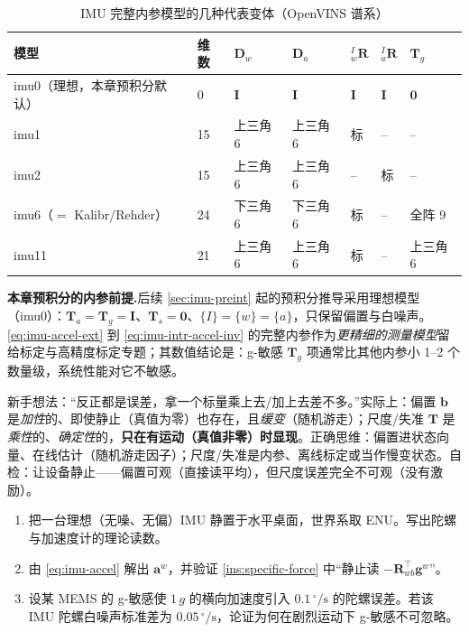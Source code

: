 \begin{table}[H]\centering\small
\caption{IMU 完整内参模型的几种代表变体（OpenVINS 谱系\cite{yang2022online}）}
\label{tab:imu-intrinsics}
\begin{tabular}{lllllll}
\toprule
模型 & 维数 & $\mathbf D_w$ & $\mathbf D_a$ & ${}^I_w\mathbf R$ & ${}^I_a\mathbf R$ & $\mathbf T_g$ \\
\midrule
imu0（理想，本章预积分默认）& 0 & $\mathbf I$ & $\mathbf I$ & $\mathbf I$ & $\mathbf I$ & $\mathbf 0$ \\
imu1 & 15 & 上三角 6 & 上三角 6 & 标 & -- & -- \\
imu2 & 15 & 上三角 6 & 上三角 6 & -- & 标 & -- \\
imu6（$=$ Kalibr/Rehder）& 24 & 下三角 6 & 下三角 6 & 标 & -- & 全阵 9 \\
imu11 & 21 & 上三角 6 & 上三角 6 & 标 & -- & 上三角 6 \\
\bottomrule
\end{tabular}
\end{table}

\begin{note}
\textbf{本章预积分的内参前提.}\;后续 \cref{sec:imu-preint} 起的预积分推导采用理想模型（imu0）：$\mathbf T_a=\mathbf T_g=\mathbf I$、$\mathbf T_s=\mathbf 0$、$\{I\}=\{w\}=\{a\}$，只保留偏置与白噪声。\cref{eq:imu-accel-ext} 到 \cref{eq:imu-intr-accel-inv} 的完整内参作为\emph{更精细的测量模型}留给标定与高精度标定专题；其数值结论是：g-敏感 $\mathbf T_g$ 项通常比其他内参小 1--2 个数量级，系统性能对它不敏感\cite{yang2022online}。
\end{note}

\begin{pitfall}
新手想法：“反正都是误差，拿一个标量乘上去/加上去差不多。”实际上：偏置 $\mathbf b$ 是\emph{加性}的、即使静止（真值为零）也存在，且\emph{缓变}（随机游走）；尺度/失准 $\mathbf T$ 是\emph{乘性}的、\emph{确定性}的，\textbf{只在有运动（真值非零）时显现}。正确思维：偏置进状态向量、在线估计（随机游走因子）；尺度/失准是内参、离线标定或当作慢变状态。自检：让设备静止——偏置可观（直接读平均），但尺度误差完全不可观（没有激励）。
\end{pitfall}

\begin{practice}
\begin{enumerate}
  \item 把一台理想（无噪、无偏）IMU 静置于水平桌面，世界系取 ENU。写出陀螺与加速度计的理论读数。
  \item 由 \cref{eq:imu-accel} 解出 $\mathbf a^w$，并验证 \cref{ins:specific-force} 中“静止读 $-\mathbf R_{wb}^\top\mathbf g^w$”。
  \item 设某 MEMS 的 g-敏感使 $1\,g$ 的横向加速度引入 $0.1\,^\circ/\mathrm s$ 的陀螺误差。若该 IMU 陀螺白噪声标准差为 $0.05\,^\circ/\mathrm s$，论证为何在剧烈运动下 g-敏感不可忽略。
\end{enumerate}
\end{practice}

